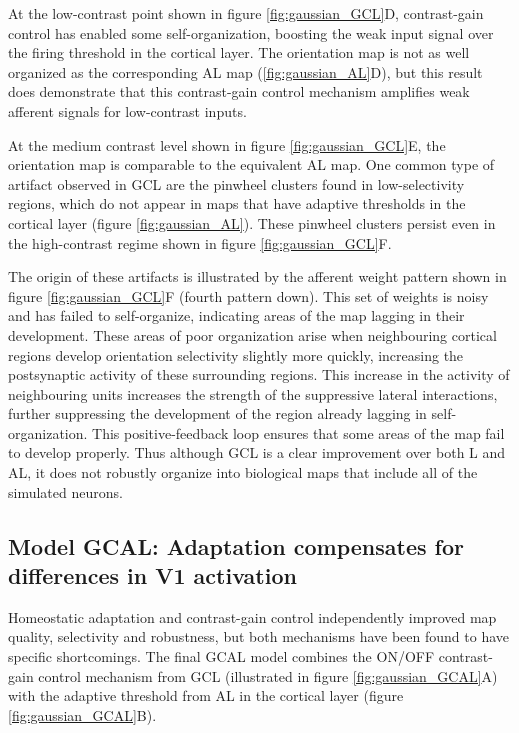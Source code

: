\documentclass{article}
\begin{document}
At the low-contrast point shown in figure \ref{fig:gaussian_GCL}D,
contrast-gain control has enabled some self-organization, boosting the
weak input signal over the firing threshold in the cortical layer. The
orientation map is not as well organized as the corresponding AL map
(\ref{fig:gaussian_AL}D), but this result does demonstrate that this
contrast-gain control mechanism amplifies weak afferent signals for
low-contrast inputs.

At the medium contrast level shown in figure \ref{fig:gaussian_GCL}E,
the orientation map is comparable to the equivalent AL map. One common
type of artifact observed in GCL are the pinwheel clusters found in
low-selectivity regions, which do not appear in maps that have adaptive
thresholds in the cortical layer (figure \ref{fig:gaussian_AL}). These
pinwheel clusters persist even in the high-contrast regime shown in
figure \ref{fig:gaussian_GCL}F.

The origin of these artifacts is illustrated by the afferent weight
pattern shown in figure \ref{fig:gaussian_GCL}F (fourth pattern
down). This set of weights is noisy and has failed to self-organize,
indicating areas of the map lagging in their development. These areas
of poor organization arise when neighbouring cortical regions develop
orientation selectivity slightly more quickly, increasing the postsynaptic
activity of these surrounding regions. This increase in the activity
of neighbouring units increases the strength of the suppressive
lateral interactions, further suppressing the development of the
region already lagging in self-organization. This positive-feedback
loop ensures that some areas of the map fail to develop properly.
Thus although GCL is a clear improvement over both L and AL, it does
not robustly organize into biological maps that include all of the
simulated neurons.

\subsection*{Model GCAL: Adaptation compensates for differences in V1 activation}

Homeostatic adaptation and contrast-gain control independently
improved map quality, selectivity and robustness, but both mechanisms
have been found to have specific shortcomings. The final GCAL model combines
the ON/OFF contrast-gain control mechanism from GCL (illustrated in figure
\ref{fig:gaussian_GCAL}A) with the adaptive threshold from AL
in the cortical layer (figure \ref{fig:gaussian_GCAL}B).
\end{document}

